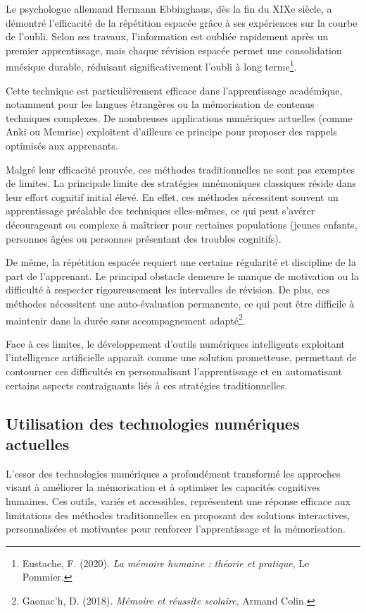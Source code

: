 \documentclass[12pt,a4paper]{report}
\begin{document}
Le psychologue allemand Hermann Ebbinghaus, dès la fin du XIXe siècle, a démontré l’efficacité de la répétition espacée grâce à ses expériences sur la courbe de l’oubli. Selon ses travaux, l'information est oubliée rapidement après un premier apprentissage, mais chaque révision espacée permet une consolidation mnésique durable, réduisant significativement l'oubli à long terme\footnote{Eustache, F. (2020). \textit{La mémoire humaine : théorie et pratique}, Le Pommier.}.

Cette technique est particulièrement efficace dans l’apprentissage académique, notamment pour les langues étrangères ou la mémorisation de contenus techniques complexes. De nombreuses applications numériques actuelles (comme Anki ou Memrise) exploitent d’ailleurs ce principe pour proposer des rappels optimisés aux apprenants.

Malgré leur efficacité prouvée, ces méthodes traditionnelles ne sont pas exemptes de limites. La principale limite des stratégies mnémoniques classiques réside dans leur effort cognitif initial élevé. En effet, ces méthodes nécessitent souvent un apprentissage préalable des techniques elles-mêmes, ce qui peut s’avérer décourageant ou complexe à maîtriser pour certaines populations (jeunes enfants, personnes âgées ou personnes présentant des troubles cognitifs).

De même, la répétition espacée requiert une certaine régularité et discipline de la part de l’apprenant. Le principal obstacle demeure le manque de motivation ou la difficulté à respecter rigoureusement les intervalles de révision. De plus, ces méthodes nécessitent une auto-évaluation permanente, ce qui peut être difficile à maintenir dans la durée sans accompagnement adapté\footnote{Gaonac'h, D. (2018). \textit{Mémoire et réussite scolaire}, Armand Colin.}.

Face à ces limites, le développement d’outils numériques intelligents exploitant l'intelligence artificielle apparaît comme une solution prometteuse, permettant de contourner ces difficultés en personnalisant l'apprentissage et en automatisant certains aspects contraignants liés à ces stratégies traditionnelles.

\subsection{Utilisation des technologies numériques actuelles}

L’essor des technologies numériques a profondément transformé les approches visant à améliorer la mémorisation et à optimiser les capacités cognitives humaines. Ces outils, variés et accessibles, représentent une réponse efficace aux limitations des méthodes traditionnelles en proposant des solutions interactives, personnalisées et motivantes pour renforcer l’apprentissage et la mémorisation.
\end{document}
